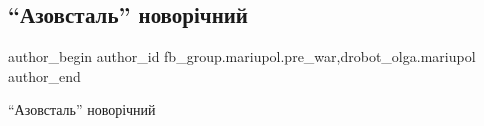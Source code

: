  
 
 
 
 

\subsection{\enquote{Азовсталь} новорічний}
\label{sec:24_01_2023.fb.fb_group.mariupol.pre_war.4._azovstal___novor_ch}
 
\ifcmt
 author_begin
   author_id fb_group.mariupol.pre_war,drobot_olga.mariupol
 author_end
\fi

\enquote{Азовсталь} новорічний
